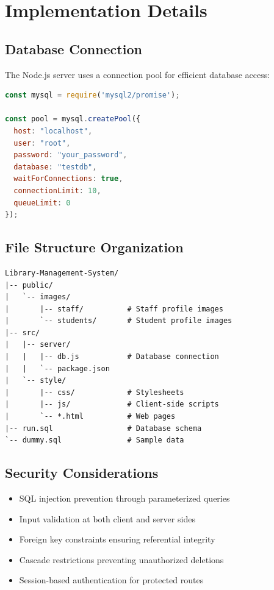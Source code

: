 \documentclass[12pt,a4paper]{article}
\begin{document}
\section{Implementation Details}

\subsection{Database Connection}

The Node.js server uses a connection pool for efficient database access:

\begin{lstlisting}[language=JavaScript, caption=MySQL Connection Pool Configuration]
const mysql = require('mysql2/promise');

const pool = mysql.createPool({
  host: "localhost",
  user: "root",
  password: "your_password",
  database: "testdb",
  waitForConnections: true,
  connectionLimit: 10,
  queueLimit: 0
});
\end{lstlisting}
\newpage
\subsection{File Structure Organization}

\begin{verbatim}
Library-Management-System/
|-- public/
|   `-- images/
|       |-- staff/          # Staff profile images
|       `-- students/       # Student profile images
|-- src/
|   |-- server/
|   |   |-- db.js           # Database connection
|   |   `-- package.json
|   `-- style/
|       |-- css/            # Stylesheets
|       |-- js/             # Client-side scripts
|       `-- *.html          # Web pages
|-- run.sql                 # Database schema
`-- dummy.sql               # Sample data
\end{verbatim}

\subsection{Security Considerations}

\begin{itemize}
    \item SQL injection prevention through parameterized queries
    \item Input validation at both client and server sides
    \item Foreign key constraints ensuring referential integrity
    \item Cascade restrictions preventing unauthorized deletions
    \item Session-based authentication for protected routes
\end{itemize}
\end{document}
